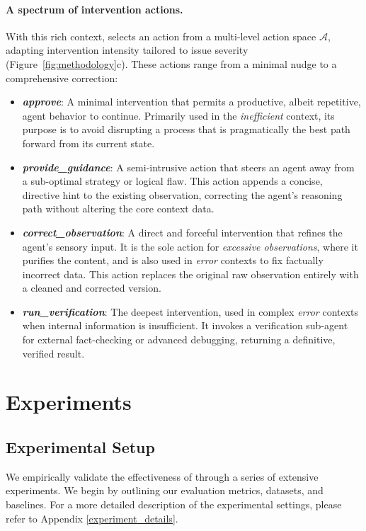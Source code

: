 \paragraph{A spectrum of intervention actions.}
With this rich context, \method selects an action from a multi-level action space $\mathcal{A}$, adapting intervention intensity tailored to issue severity (Figure~\ref{fig:methodology}c).
These actions range from a minimal nudge to a comprehensive correction:
\begin{itemize}[nosep, leftmargin=15pt]
    \item \emph{\textbf{approve}}: A minimal intervention that permits a productive, albeit repetitive, agent behavior to continue. Primarily used in the \emph{inefficient} context, its purpose is to avoid disrupting a process that is pragmatically the best path forward from its current state.
    \item \emph{\textbf{provide\_guidance}}: A semi-intrusive action that steers an agent away from a sub-optimal strategy or logical flaw. This action appends a concise, directive hint to the existing observation, correcting the agent's reasoning path without altering the core context data.
    \item \emph{\textbf{correct\_observation}}: A direct and forceful intervention that refines the agent's sensory input. It is the sole action for \emph{excessive observations}, where it purifies the content, and is also used in \emph{error} contexts to fix factually incorrect data.
          This action replaces the original raw observation entirely with a cleaned and corrected version.
    \item \emph{\textbf{run\_verification}}: The deepest intervention, used in complex \emph{error} contexts when internal information is insufficient.
          It invokes a verification sub-agent for external fact-checking or advanced debugging, returning a definitive, verified result.
\end{itemize}


\section{Experiments}
\label{sec:experiments}

\subsection{Experimental Setup}
We empirically validate the effectiveness of \method through a series of extensive experiments.
We begin by outlining our evaluation metrics, datasets, and baselines.
For a more detailed description of the experimental settings, please refer to Appendix \ref{experiment_details}.

